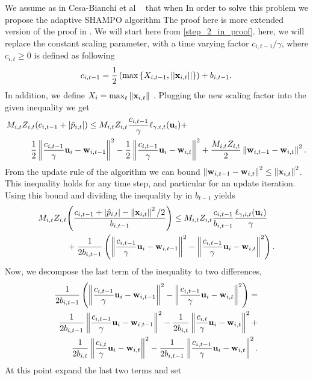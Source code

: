 {We assume as in Cesa-Bianchi et al  ~\cite{cesa2006worst} that when  In order to solve this problem we propose the adaptive SHAMPO algorithm 
The proof here is more  extended version of the proof in  . We will start here from \eqref{step_2_in_proof}. here, we will replace the constant scaling parameter, with a time varying factor $c_{i,t-1}/\gamma$, where $c_{i,t}\ge0$  is defined as following 
\begin{equation*}
c_{i,t-1}=\frac{1}{2}\left({\max{\left\{{X_{i,t-1},\left\vert{\left\vert{\mathbf{x}_{i,t}}\right\vert}\right\vert}\right\}}}\right)+b_{i,t-1}.
\end{equation*}
In addition, we define $X_i=\max_t{\Vert\mathbf{x}_{i,t}\Vert}$ . Plugging the new scaling factor into the given inequality we get 
\begin{equation*}
\begin{split}
M_{i,t}Z_{i,t}{\left({c_{i,t-1} +\left\vert{\hat{p}_{i,t}}\right\vert}\right)} \le M_{i,t}&Z_{i,t}\frac{c_{i,t-1}}{\gamma} \ell_{\gamma,i,t}(\mathbf{u}_i)+\\ 
\frac{1}{2}\left\Vert {\frac{c_{i,t-1}}{\gamma} \mathbf{u}_i-\mathbf{w}_{i,t-1}} \right\Vert^2&-\frac{1}{2}\left\Vert {\frac{c_{i,t-1}}{\gamma} \mathbf{u}_i-\mathbf{w}_{i,t}} \right\Vert^2+
\frac{M_{i,t}Z_{i,t}}{2}\left\Vert {\mathbf{w}_{i,t-1}-\mathbf{w}_{i,t}} \right\Vert^2.
\end{split}
\end{equation*}
 From the update rule of the  algorithm we can bound $\left\Vert {\mathbf{w}_{i,t-1}-\mathbf{w}_{i,t}} \right\Vert^2\le \left\Vert {\mathbf{x}_{i,t}} \right\Vert^2$. This inequality holds for any time step, and particular for an update iteration. Using this bound and dividing the inequality by in  $b_{t-1}$ yields
\begin{equation}
\begin{split}
M_{i,t}Z_{i,t}&{\left({\frac{c_{i,t-1} +\left\vert{\hat{p}_{i,t}}\right\vert-\left\Vert {\mathbf{x}_{i,t}} \right\Vert^2/2}{b_{i,t-1}}}\right)} \le M_{i,t}Z_{i,t}\frac{c_{i,t-1}}{b_{i,t-1}}\frac{\ell_{\gamma,i,t}(\mathbf{u}_i)}{\gamma} \\ 
&+\frac{1}{2b_{i,t-1
}}\left({\left\Vert {\frac{c_{i,t-1}}{\gamma} \mathbf{u}_i-\mathbf{w}_{i,t-1}} \right\Vert^2-\left\Vert {\frac{c_{i,t-1}}{\gamma} \mathbf{u}_i-\mathbf{w}_{i,t}} \right\Vert^2}\right).
\label{eq:adaptive_b_first_step}
\end{split}
\end{equation}
Now, we decompose the last term of the inequality to two  differences,
\begin{equation*}
\begin{split}
\frac{1}{2b_{i,t-1}}
\left({\left\Vert {\frac{c_{i,t-1}}{\gamma} \mathbf{u}_i-\mathbf{w}_{i,t-1}} \right\Vert^2-\left\Vert {\frac{c_{i,t-1}}{\gamma} \mathbf{u}_i-\mathbf{w}_{i,t}} \right\Vert^2}\right)= \\
\frac{1}{2b_{i,t-1}}\left\Vert {\frac{c_{i,t-1}}{\gamma} \mathbf{u}_i-\mathbf{w}_{i,t-1}} \right\Vert^2-\frac{1}{2b_{i,t}}\left\Vert {\frac{c_{i,t}}{\gamma} \mathbf{u}_i-\mathbf{w}_{i,t}} \right\Vert^2+\\
\frac{1}{2b_{i,t}}\left\Vert {\frac{c_{i,t}}{\gamma} \mathbf{u}_i-\mathbf{w}_{i,t}} \right\Vert^2-\frac{1}{2b_{i,t-1}}\left\Vert {\frac{c_{i,t-1}}{\gamma} \mathbf{u}_i-\mathbf{w}_{i,t}} \right\Vert^2.
\end{split}
\end{equation*}
At this point  expand the last two terms and  set   

}

